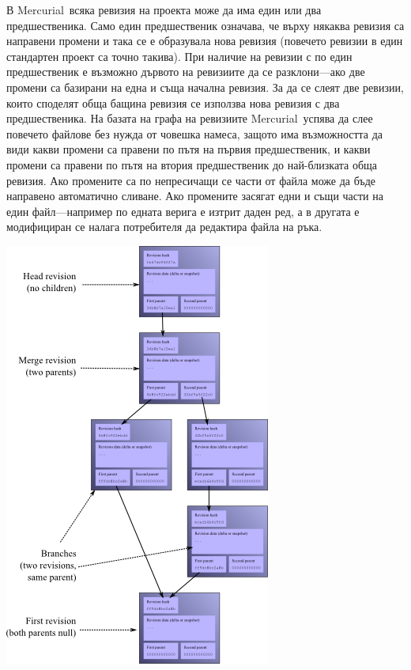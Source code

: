 \documentclass[a4paper]{article}
\def\Hg{Mercurial}
\begin{document}
    В \Hg\ всяка ревизия на проекта може да има един или два предшественика.
    Само един предшественик означава, че върху някаква ревизия са направени
    промени и така се е образувала нова ревизия (повечето ревизии в един
    стандартен проект са точно такива). При наличие на ревизии с по един
    предшественик е възможно дървото на ревизиите да се разклони---ако две
    промени са базирани на една и съща начална ревизия. За да се слеят две
    ревизии, които споделят обща бащина ревизия се използва нова ревизия с два
    предшественика. На базата на графа на ревизиите \Hg\ успява да слее повечето
    файлове без нужда от човешка намеса, защото има възможността да види какви
    промени са правени по пътя на първия предшественик, и какви промени са
    правени по пътя на втория предшественик до най-близката обща ревизия. Ако
    промените са по непресичащи се части от файла може да бъде направено
    автоматично сливане. Ако промените засягат едни и същи части на един
    файл---например по едната верига е изтрит даден ред, а в другата
    е модифициран се налага потребителя да редактира файла на ръка.

    \includegraphics[scale=0.5]{hg_revisions}
\end{document}
